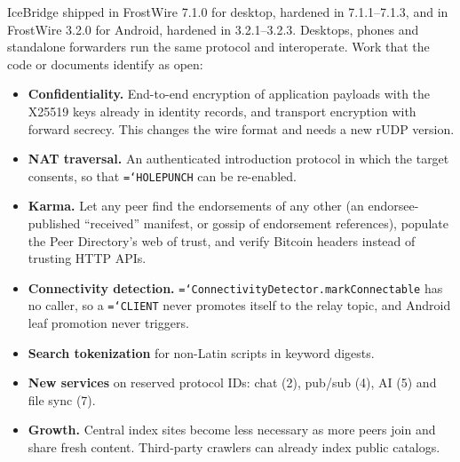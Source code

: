 \documentclass[11pt,a4paper]{article}
\newcommand{\code}[1]{\texttt{\hyphenchar\font=`\-\relax #1}}
\DeclareRobustCommand{\_}{\origunderscore\allowbreak}
\begin{document}
IceBridge shipped in FrostWire 7.1.0 for desktop, hardened in 7.1.1--7.1.3, and in FrostWire
3.2.0 for Android, hardened in 3.2.1--3.2.3. Desktops, phones and standalone forwarders run the
same protocol and interoperate. Work that the code or documents identify as open:
\begin{itemize}
\item \textbf{Confidentiality.} End-to-end encryption of application payloads with the X25519
  keys already in identity records, and transport encryption with forward secrecy. This
  changes the wire format and needs a new rUDP version.
\item \textbf{NAT traversal.} An authenticated introduction protocol in which the target
  consents, so that \code{HOLE\_PUNCH} can be re-enabled.
\item \textbf{Karma.} Let any peer find the endorsements of any other (an endorsee-published
  ``received'' manifest, or gossip of endorsement references), populate the Peer Directory's web
  of trust, and verify Bitcoin headers instead of trusting HTTP APIs.
\item \textbf{Connectivity detection.} \code{ConnectivityDetector.markConnectable} has no
  caller, so a \code{CLIENT} never promotes itself to the relay topic, and Android leaf
  promotion never triggers.
\item \textbf{Search tokenization} for non-Latin scripts in keyword digests.
\item \textbf{New services} on reserved protocol IDs: chat (2), pub/sub (4), AI (5) and file
  sync (7).
\item \textbf{Growth.} Central index sites become less necessary as more peers join and share
  fresh content. Third-party crawlers can already index public catalogs.
\end{itemize}
\end{document}
